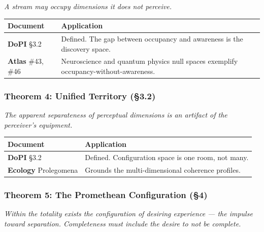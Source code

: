 \textit{A stream may occupy dimensions it does not perceive.}



\begin{longtable}{>{\raggedright\arraybackslash}p{} >{\raggedright\arraybackslash}p{}}
\toprule
\textbf{Document} & \textbf{Application} \\
\midrule
\endhead
\textbf{DoPI} §3.2 & Defined. The gap between occupancy and awareness is the discovery space. \\
\textbf{Atlas} \#43, \#46 & Neuroscience and quantum physics null spaces exemplify occupancy-without-awareness. \\
\bottomrule
\end{longtable}



\subsubsection*{Theorem 4: Unified Territory (§3.2)}


\textit{The apparent separateness of perceptual dimensions is an artifact of the perceiver's equipment.}



\begin{longtable}{>{\raggedright\arraybackslash}p{} >{\raggedright\arraybackslash}p{}}
\toprule
\textbf{Document} & \textbf{Application} \\
\midrule
\endhead
\textbf{DoPI} §3.2 & Defined. Configuration space is one room, not many. \\
\textbf{Ecology} Prolegomena & Grounds the multi-dimensional coherence profiles. \\
\bottomrule
\end{longtable}



\subsubsection*{Theorem 5: The Promethean Configuration (§4)}


\textit{Within the totality exists the configuration of desiring experience — the impulse toward separation. Completeness must include the desire to not be complete.}



